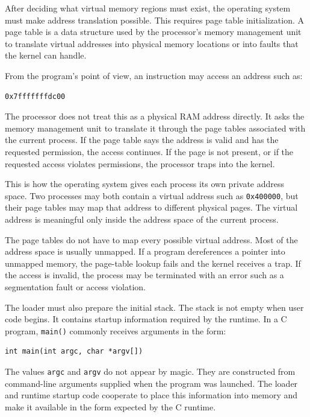 After deciding what virtual memory regions must exist, the operating system must make address translation possible. This requires page table initialization. A page table is a data structure used by the processor's memory management unit to translate virtual addresses into physical memory locations or into faults that the kernel can handle.

From the program's point of view, an instruction may access an address such as:

\begin{verbatim}
0x7fffffffdc00
\end{verbatim}

The processor does not treat this as a physical RAM address directly. It asks the memory management unit to translate it through the page tables associated with the current process. If the page table says the address is valid and has the requested permission, the access continues. If the page is not present, or if the requested access violates permissions, the processor traps into the kernel.

This is how the operating system gives each process its own private address space. Two processes may both contain a virtual address such as \texttt{0x400000}, but their page tables may map that address to different physical pages. The virtual address is meaningful only inside the address space of the current process.

The page tables do not have to map every possible virtual address. Most of the address space is usually unmapped. If a program dereferences a pointer into unmapped memory, the page-table lookup fails and the kernel receives a trap. If the access is invalid, the process may be terminated with an error such as a segmentation fault or access violation.

The loader must also prepare the initial stack. The stack is not empty when user code begins. It contains startup information required by the runtime. In a C program, \texttt{main()} commonly receives arguments in the form:

\begin{verbatim}
int main(int argc, char *argv[])
\end{verbatim}

The values \texttt{argc} and \texttt{argv} do not appear by magic. They are constructed from command-line arguments supplied when the program was launched. The loader and runtime startup code cooperate to place this information into memory and make it available in the form expected by the C runtime.

